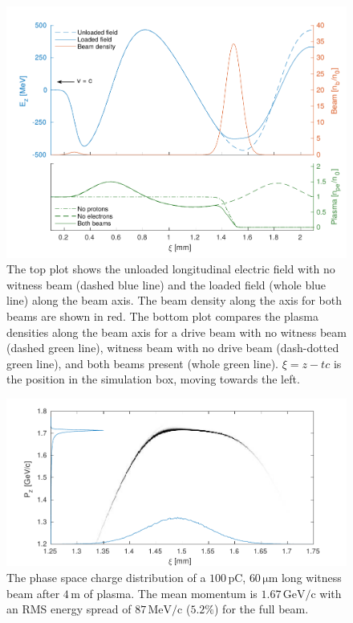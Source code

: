 \documentclass[aps,prstab,reprint,amsmath,amssymb,groupedaddress]{revtex4-1}
\newcommand{\unit}[1]{\,\mathrm{#1}}
\begin{document}
\begin{figure}[hbt]
    \includegraphics[width=\linewidth,trim={2mm 0mm 2mm 0mm},clip]{figures/beamLoading}
    \caption{\label{Fig:BeamLoading} The top plot shows the unloaded longitudinal electric field with no witness beam
        (dashed blue line) and the loaded field (whole blue line) along the beam axis. The beam density along the axis
        for both beams are shown in red. The bottom plot compares the plasma densities along the beam axis for a drive
        beam with no witness beam (dashed green line), witness beam with no drive beam (dash-dotted green line), and
        both beams present (whole green line). $\xi = z - tc$ is the position in the simulation box, moving towards the
        left.}
\end{figure}

\begin{figure}[hbt]
    \includegraphics[width=\linewidth,trim={2mm 0mm 2mm 0mm},clip]{figures/beamPhaseSpace}
    \caption{\label{Fig:BeamPS} The phase space charge distribution of a $100\unit{pC}$, $60\unit{\mu m}$ long witness
        beam after $4\unit{m}$ of plasma. The mean momentum is $1.67\unit{GeV/c}$ with an RMS energy spread of
        $87\unit{MeV/c}$ ($5.2\%$) for the full beam.}
\end{figure}
\end{document}
